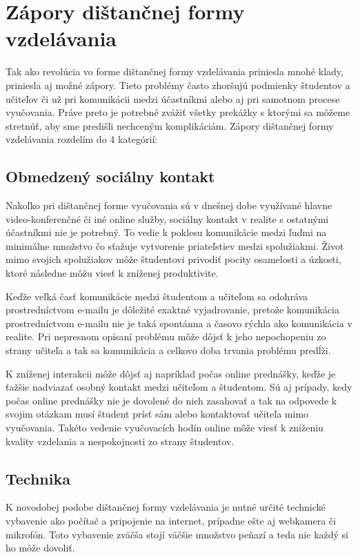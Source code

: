 \documentclass[10pt,slovak,a4paper]{article}
\begin{document}
\section{Zápory dištančnej formy vzdelávania}
	Tak ako revolúcia vo forme dištančnej formy vzdelávania priniesla mnohé klady, priniesla aj možné zápory. Tieto problémy často zhoršujú podmienky študentov a učiteľov či už pri komunikácii medzi účastníkmi alebo aj pri samotnom procese vyučovania. Práve preto je potrebné zvážiť všetky prekážky s ktorými sa môžeme stretnúť, aby sme predišli nechceným komplikáciám. Zápory dištančnej formy vzdelávania rozdelím do 4 kategórií:

\subsection{Obmedzený sociálny kontakt}
	Nakoľko pri dištančnej forme vyučovania sú v dnešnej dobe využívané hlavne video-konferenčné či iné online služby, sociálny kontakt v realite s ostatnými účastníkmi nie je potrebný. To vedie k poklesu komunikácie medzi ľuďmi na minimálne množstvo čo sťažuje vytvorenie priateľstiev medzi spolužiakmi. Život mimo svojich spolužiakov môže študentovi privodiť pocity osamelosti a úzkosti, ktoré následne môžu viesť k zníženej produktivite. 

	Keďže veľká časť komunikácie medzi študentom a učiteľom sa odohráva prostredníctvom e-mailu je dôležité exaktné vyjadrovanie, pretože komunikácia prostredníctvom e-mailu nie je taká spontánna a časovo rýchla ako komunikácia v realite. Pri nepresnom opísaní problému môže dôjsť k jeho nepochopeniu zo strany učiteľa a tak sa komunikácia a celkovo doba trvania problému predĺži. 

	K zníženej interakcii môže dôjsť aj napríklad počas online prednášky, keďže je ťažšie nadviazať osobný kontakt medzi učiteľom a študentom. Sú aj prípady, kedy počas online prednášky nie je dovolené do nich zasahovať a tak na odpovede k svojim otázkam musí študent prísť sám alebo kontaktovať učiteľa mimo vyučovania. Takéto vedenie vyučovacích hodín online môže viesť k zníženiu kvality vzdelania a nespokojnosti zo strany študentov.

\subsection{Technika}
	K novodobej podobe dištančnej formy vzdelávania je nutné určité technické vybavenie ako počítač a pripojenie na internet, prípadne ešte aj webkamera či mikrofón. Toto vybavenie zväčša stojí väčšie množstvo peňazí a teda nie každý si ho môže dovoliť. 
\end{document}
